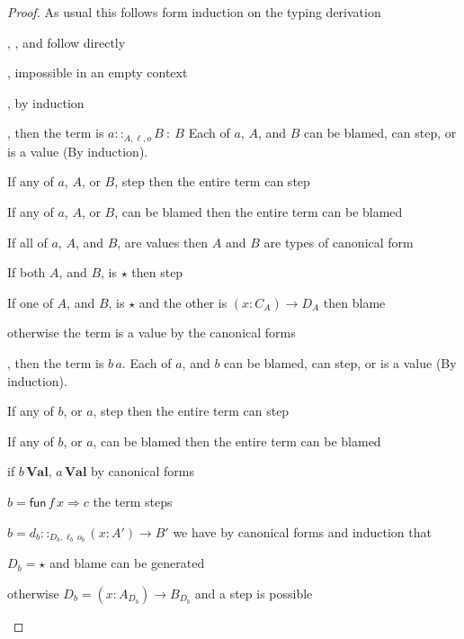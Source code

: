 \begin{proof}
As usual this follows form induction on the typing derivation
 
\begin{casenv}
 \item {}, , and  follow directly
 \item {}, impossible in an empty context
 \item {}, by induction
 \item {}, then the term is $a::_{A,\ell ,o}B\::\:B$
 Each of $a$, $A$, and $B$ can be blamed, can step, or is a value (By induction).
 \begin{casenv}
   \item If any of $a$, $A$, or $B$, step then the entire term can step
   \item If any of $a$, $A$, or $B$, can be blamed then the entire term can be blamed
   \item If all of $a$, $A$, and $B$, are values then $A$ and $B$ are types of canonical form
   \begin{casenv}
     \item If both $A$, and $B$, is $\star$ then step
     \item If one of $A$, and $B$, is $\star$ and the other is $\left(x:C_{A}\right)\rightarrow D_{A}$ then blame
    
     \item otherwise the term is a value by the canonical forms
   \end{casenv}
 \end{casenv}
 \item {}, then the term is $b\,a$.
  Each of $a$, and $b$ can be blamed, can step, or is a value (By induction).
  \begin{casenv}
    \item If any of $b$, or $a$, step then the entire term can step
    \item If any of $b$, or $a$, can be blamed then the entire term can be blamed
    \item if $b\,\textbf{Val}$, $a\,\textbf{Val}$ by canonical forms
    \begin{casenv}
      \item $b=\mathsf{fun}\,f\,x\Rightarrow c$ the term steps
      \item $b=d_{b}::_{D_{b},\ell _{b}\,o_{b}}\left(x:A'\right)\rightarrow B'$ we have by canonical forms and induction that
      \begin{casenv}
        \item $D_{b}=\star$ and blame can be generated
        \item otherwise $D_{b}=\left(x:A_{D_{b}}\right)\rightarrow B_{D_{b}}$ and a step is possible
      \end{casenv}
    \end{casenv}
  \end{casenv}
\end{casenv}
\end{proof}
 
